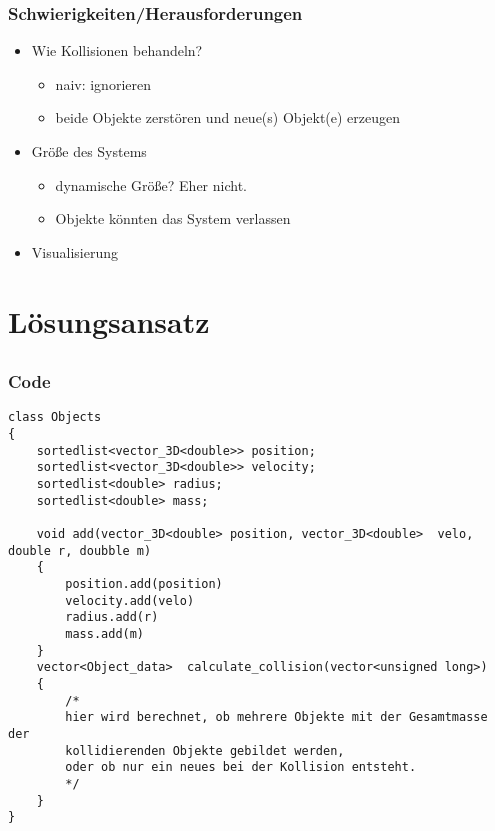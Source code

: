 \documentclass{beamer}
\begin{document}

\begin{frame}
    \frametitle{Schwierigkeiten/Herausforderungen}
    \begin{itemize}
        \item Wie Kollisionen behandeln?
            \begin{itemize}
                \item naiv: ignorieren
                \item beide Objekte zerstören und neue(s) Objekt(e) erzeugen
            \end{itemize}
        \item Größe des Systems
            \begin{itemize}
                \item dynamische Größe? Eher nicht.
                \item Objekte könnten das System verlassen
            \end{itemize}
        \item Visualisierung
    \end{itemize}
\end{frame}


\section{Lösungsansatz}
\subsection{}


\begin{frame}[fragile]
    \frametitle{Code}
    \begin{verbatim}
class Objects
{
    sortedlist<vector_3D<double>> position;
    sortedlist<vector_3D<double>> velocity;
    sortedlist<double> radius;
    sortedlist<double> mass;

    void add(vector_3D<double> position, vector_3D<double>  velo, double r, doubble m)
    {
        position.add(position)
        velocity.add(velo)
        radius.add(r)
        mass.add(m)
    }
    vector<Object_data>  calculate_collision(vector<unsigned long>)
    {
        /*
        hier wird berechnet, ob mehrere Objekte mit der Gesamtmasse der
        kollidierenden Objekte gebildet werden,
        oder ob nur ein neues bei der Kollision entsteht.
        */
    }
}
    \end{verbatim}
\end{frame}
\end{document}
